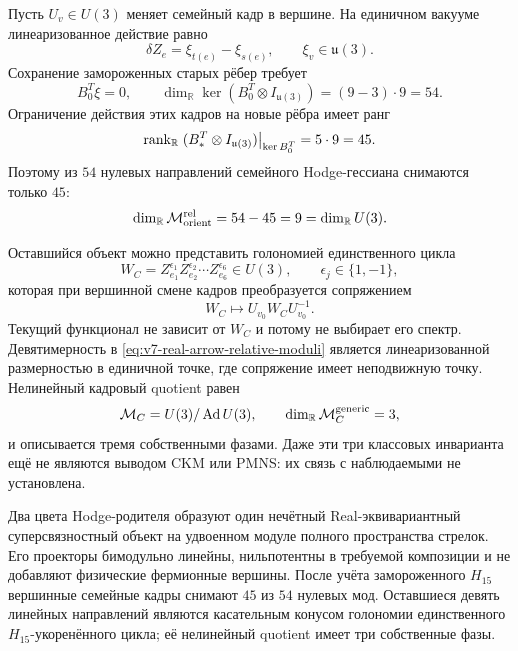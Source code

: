 Пусть $U_v\in U(3)$ меняет семейный кадр в вершине. На единичном вакууме
линеаризованное действие равно
\begin{equation}
 \delta Z_e=\xi_{t(e)}-\xi_{s(e)},
 \qquad \xi_v\in\mathfrak u(3).
 \label{eq:v7-real-arrow-frame-action}
\end{equation}
Сохранение замороженных старых рёбер требует
\begin{equation}
 B_0^T\xi=0,\qquad
 \dim_{\mathbb R}\ker(B_0^T\otimes I_{\mathfrak u(3)})
 =(9-3)\cdot9=54.
 \label{eq:v7-real-arrow-baseline-frame-kernel}
\end{equation}
Ограничение действия этих кадров на новые рёбра имеет ранг
\begin{equation}
 \operatorname{rank}_{\mathbb R}
 \left.(B_*^T\otimes I_{\mathfrak u(3)})\right|_{\ker B_0^T}
 =5\cdot9=45.
 \label{eq:v7-real-arrow-relative-frame-rank}
\end{equation}
Поэтому из $54$ нулевых направлений семейного Hodge-гессиана снимаются
только $45$:
\begin{equation}
 \dim_{\mathbb R}\mathcal M_{\rm orient}^{\rm rel}
 =54-45=9=\dim_{\mathbb R}U(3).
 \label{eq:v7-real-arrow-relative-moduli}
\end{equation}

Оставшийся объект можно представить голономией единственного цикла
\begin{equation}
 W_C=Z_{e_1}^{\epsilon_1}Z_{e_2}^{\epsilon_2}\cdots
 Z_{e_6}^{\epsilon_6}\in U(3),
 \qquad \epsilon_j\in\{1,-1\},
 \label{eq:v7-real-arrow-cycle-holonomy}
\end{equation}
которая при вершинной смене кадров преобразуется сопряжением
\begin{equation}
 W_C\longmapsto U_{v_0}W_CU_{v_0}^{-1}.
 \label{eq:v7-real-arrow-holonomy-conjugation}
\end{equation}
Текущий функционал не зависит от $W_C$ и потому не выбирает его спектр.
Девятимерность в \eqref{eq:v7-real-arrow-relative-moduli} является
линеаризованной размерностью в единичной точке, где сопряжение имеет
неподвижную точку. Нелинейный кадровый quotient равен
\begin{equation}
 \mathcal M_C=U(3)/\operatorname{Ad}U(3),
 \qquad \dim_{\mathbb R}\mathcal M_C^{\rm generic}=3,
 \label{eq:v7-real-arrow-conjugacy-quotient}
\end{equation}
и описывается тремя собственными фазами. Даже эти три классовых инварианта
ещё не являются выводом CKM или PMNS: их связь с наблюдаемыми не установлена.

\begin{theorem}
Два цвета Hodge-родителя образуют один нечётный Real-эквивариантный
суперсвязностный объект на удвоенном модуле полного пространства стрелок.
Его проекторы бимодульно линейны, нильпотентны в требуемой композиции и не
добавляют физические фермионные вершины. После учёта замороженного $H_{15}$
вершинные семейные кадры снимают $45$ из $54$ нулевых мод. Оставшиеся девять
линейных направлений являются касательным конусом голономии единственного
$H_{15}$-укоренённого цикла; её нелинейный quotient имеет три собственные
фазы.
\end{theorem}

